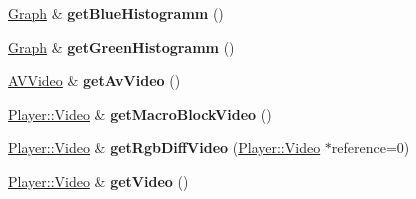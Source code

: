 \begin{DoxyCompactItemize}
\item 
\hypertarget{classEncodedVideo_a0ab160b73b3cb40b14bc05ed212341db}{}\hyperlink{classGraph}{Graph} \& {\bfseries get\+Blue\+Histogramm} ()\label{classEncodedVideo_a0ab160b73b3cb40b14bc05ed212341db}

\item 
\hypertarget{classEncodedVideo_adb3dc1a2f3b80bbea1610ba78bd9421b}{}\hyperlink{classGraph}{Graph} \& {\bfseries get\+Green\+Histogramm} ()\label{classEncodedVideo_adb3dc1a2f3b80bbea1610ba78bd9421b}

\item 
\hypertarget{classEncodedVideo_a80b45e8ca2b2ebcc550b2416e5040ed8}{}\hyperlink{classAVVideo}{A\+V\+Video} \& {\bfseries get\+Av\+Video} ()\label{classEncodedVideo_a80b45e8ca2b2ebcc550b2416e5040ed8}

\item 
\hypertarget{classEncodedVideo_aaca4dda241b258773747ef4a755805c6}{}\hyperlink{classPlayer_1_1Video}{Player\+::\+Video} \& {\bfseries get\+Macro\+Block\+Video} ()\label{classEncodedVideo_aaca4dda241b258773747ef4a755805c6}

\item 
\hypertarget{classEncodedVideo_a2499e36167fd87e32173333a95c2b4d6}{}\hyperlink{classPlayer_1_1Video}{Player\+::\+Video} \& {\bfseries get\+Rgb\+Diff\+Video} (\hyperlink{classPlayer_1_1Video}{Player\+::\+Video} $\ast$reference=0)\label{classEncodedVideo_a2499e36167fd87e32173333a95c2b4d6}

\item 
\hypertarget{classEncodedVideo_ada3059b0113937e0393f1f4a26525abb}{}\hyperlink{classPlayer_1_1Video}{Player\+::\+Video} \& {\bfseries get\+Video} ()\label{classEncodedVideo_ada3059b0113937e0393f1f4a26525abb}

\end{DoxyCompactItemize}
